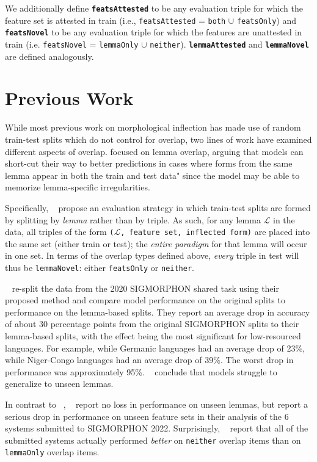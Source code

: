 \documentclass[11pt]{article}
\newcommand{\goldmant}{\citet{goldman-etal-2022-un}}
\newcommand{\goldmana}{\citeauthor{goldman-etal-2022-un}}
\newcommand{\kodnert}{\citet{kodner-etal-2022-sigmorphon}}
\newcommand{\kodnera}{\citeauthor{kodner-etal-2022-sigmorphon}}
\begin{document}
We additionally define \textbf{\texttt{featsAttested}} to be any evaluation triple for which the feature set is attested in train (i.e., \texttt{featsAttested} = \texttt{both} $\cup$ \texttt{featsOnly}) and \textbf{\texttt{featsNovel}} to be any evaluation triple for which the features are unattested in train (i.e. \texttt{featsNovel} = \texttt{lemmaOnly} $\cup$ \texttt{neither}). 
\textbf{\texttt{lemmaAttested}} and \textbf{\texttt{lemmaNovel}} are defined analogously. 



\section{Previous Work}

While most previous work on morphological inflection has made use of random train-test splits which do not control for overlap, two lines of work have examined different aspects of overlap. 
\citet[864]{goldman-etal-2022-un} focused on lemma overlap, arguing that models can short-cut their way to better predictions in cases where forms from the same lemma appear in both the train and test data" since the model may  be able to memorize lemma-specific irregularities.

Specifically, \goldmana~ propose an evaluation strategy in which train-test splits are formed by splitting by \textit{lemma} rather than by triple. 
As such, for any  lemma $\mathcal{L}$ in the data, all triples of the form \texttt{($\mathcal{L}$, feature set, inflected form)} are placed into the same set (either train or test); the \textit{entire paradigm} for that lemma will occur in one set. 
In terms of the overlap types defined above, \textit{every} triple in test will thus be \texttt{lemmaNovel}: either \texttt{featsOnly} or \texttt{neither}. 


\goldmana~ re-split the data from the 2020 SIGMORPHON shared task using their proposed method and compare model performance  on the original splits to performance on the lemma-based splits. 
They report an average drop in accuracy of about 30 percentage points from the original SIGMORPHON splits to their lemma-based splits, with the effect being the most significant for low-resourced languages. 
For example, while Germanic languages had an average drop of 23\%, while Niger-Congo languages had an average drop of 39\%. 
The worst drop in performance was approximately 95\%. 
\goldmana~ conclude that models struggle to generalize to unseen lemmas. 

In contrast to \goldmant~, \kodnert~ report no loss in performance on unseen lemmas, but report a serious drop in performance on unseen feature sets in their analysis of the 6 systems submitted to SIGMORPHON 2022.
Surprisingly, \kodnera~ report that all of the submitted systems actually performed \textit{better} on \texttt{neither} overlap items than on \texttt{lemmaOnly} overlap items. 
\end{document}
